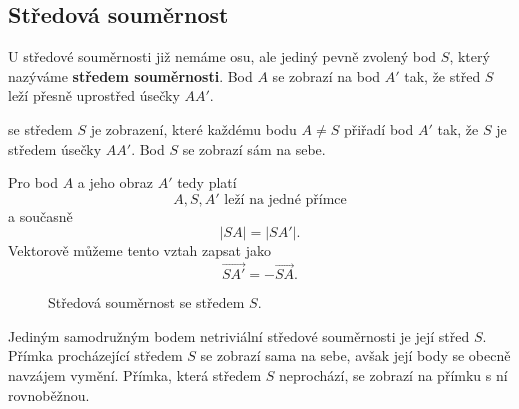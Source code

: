 \documentclass[12pt,a4paper]{article}
\begin{document}

\subsection{Středová souměrnost}

U středové souměrnosti již nemáme osu, ale jediný pevně zvolený bod $S$, který nazýváme \textbf{středem souměrnosti}. Bod $A$ se zobrazí na bod $A'$ tak, že střed $S$ leží přesně uprostřed úsečky $AA'$.

\begin{definitionbox}
     se středem $S$ je zobrazení, které každému bodu $A\neq S$ přiřadí bod $A'$ tak, že $S$ je středem úsečky $AA'$. Bod $S$ se zobrazí sám na sebe.
\end{definitionbox}

Pro bod $A$ a jeho obraz $A'$ tedy platí
\[
    A,S,A' \text{ leží na jedné přímce}
\]
a současně
\[
    |SA|=|SA'|.
\]
Vektorově můžeme tento vztah zapsat jako
\[
    \overrightarrow{SA'}=-\overrightarrow{SA}.
\]

\begin{figure}[ht]
    \centering
    \caption{Středová souměrnost se středem $S$.}
\end{figure}

Jediným samodružným bodem netriviální středové souměrnosti je její střed $S$. Přímka procházející středem $S$ se zobrazí sama na sebe, avšak její body se obecně navzájem vymění. Přímka, která středem $S$ neprochází, se zobrazí na přímku s ní rovnoběžnou.
\end{document}
